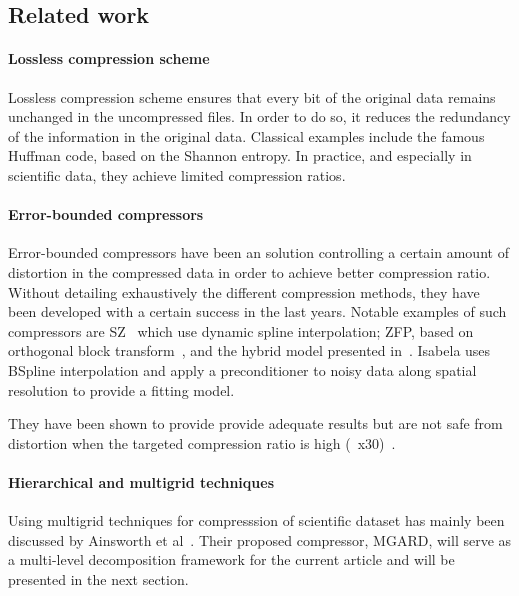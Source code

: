 \documentclass[conference]{IEEEtran}
\theoremstyle{remark}
\begin{document}
\subsection{Related work}

\paragraph{Lossless compression scheme}
Lossless compression scheme ensures that every bit of the original data remains unchanged in the uncompressed files.
In order to do so, it reduces the redundancy of the information in the original data.
Classical examples include the famous Huffman code, based on the Shannon entropy.
In practice, and especially in scientific data, they achieve limited compression ratios.

\paragraph{Error-bounded compressors}
Error-bounded compressors have been an solution controlling a certain amount of distortion in the compressed data in order to achieve better compression ratio.
Without detailing exhaustively the different compression methods, they have been developed with a certain success in the last years.
Notable examples of such compressors are SZ~\cite{liang2018error} which use dynamic spline interpolation; ZFP, based on orthogonal block transform~\cite{lindstrom2014fixed},
and the hybrid model presented in~\cite{liang2019significantly}.
Isabela\cite{lakshminarasimhan2013isabela} uses BSpline interpolation and apply a preconditioner to noisy data along spatial resolution to provide a fitting model.

They have been shown to provide provide adequate results but are not safe from distortion when the targeted compression ratio is high (~x30)~\cite{liang2019significantly}.

\paragraph{Hierarchical and multigrid techniques}
Using multigrid techniques for compresssion of scientific dataset has mainly been discussed by Ainsworth et al~\cite{ainsworth2018multilevel,ainsworth2019multilevel,ainsworth20quantitative}.
Their proposed compressor, MGARD, will serve as a multi-level decomposition framework for the current article and will be presented in the next section.
\end{document}
